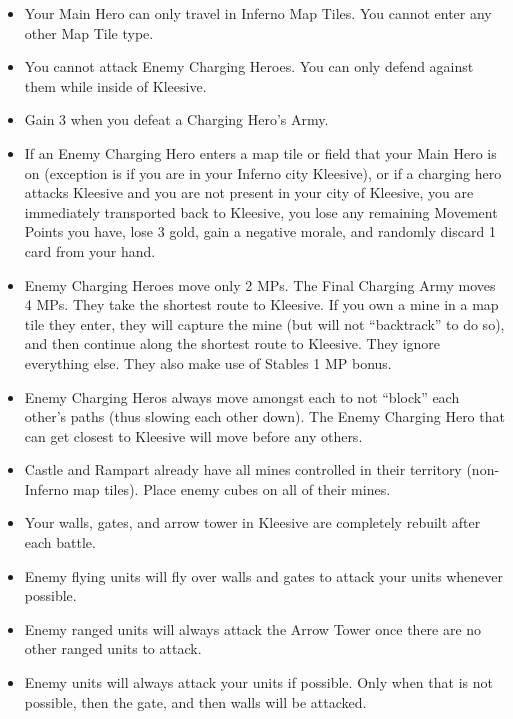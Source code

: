 \begin{multicols*}{2}
\begin{itemize}
  \item Your Main Hero can only travel in Inferno Map Tiles. You cannot enter any other Map Tile type.
  \item You cannot attack Enemy Charging Heroes. You can only defend against them while inside of Kleesive.
  \item Gain 3 when you defeat a Charging Hero's Army.
  \item If an Enemy Charging Hero enters a map tile or field that your Main Hero is on (exception is if you are in
    your Inferno city Kleesive), or if a charging hero attacks Kleesive and you are not present in your city
    of Kleesive, you are immediately transported back to Kleesive, you lose any remaining Movement Points
    you have, lose 3 gold, gain a negative morale, and randomly discard 1 card from your hand.
  \item Enemy Charging Heroes move only 2 MPs. The Final Charging Army moves 4 MPs. They take the shortest
    route to Kleesive. If you own a mine in a map tile they enter, they will capture the mine (but will not
    ``backtrack'' to do so), and then continue along the shortest route to Kleesive. They ignore everything
    else. They also make use of Stables 1 MP bonus.
  \item Enemy Charging Heros always move amongst each to not ``block'' each other's paths (thus slowing each
    other down). The Enemy Charging Hero that can get closest to Kleesive will move before any others.
  \item Castle and Rampart already have all mines controlled in their territory (non-Inferno map tiles). Place enemy
    cubes on all of their mines.
  \item Your walls, gates, and arrow tower in Kleesive are completely rebuilt after each battle.
  \item Enemy flying units will fly over walls and gates to attack your units whenever possible.
  \item Enemy ranged units will always attack the Arrow Tower once there are no other ranged units to attack.
  \item Enemy units will always attack your units if possible. Only when that is not possible, then the gate,
    and then walls will be attacked.
\end{itemize}

\end{multicols*}

